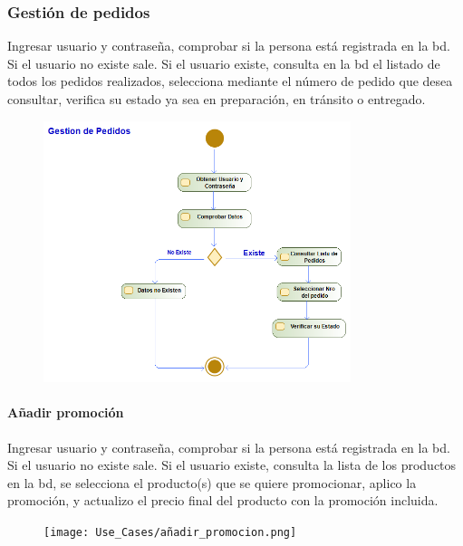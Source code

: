 \subsubsection{Gestión de pedidos}
Ingresar usuario y contraseña, comprobar si la persona está registrada en la \gls{bd}. Si el usuario no existe sale. Si el usuario existe, consulta en la \gls{bd} el listado de todos los pedidos realizados, selecciona mediante el número de pedido que desea consultar, verifica su estado ya sea en preparación, en tránsito o entregado.
\begin{figure}[H]
    \centering
    \includegraphics[width=0.8\textwidth]{Use_Cases/gestion_de_pedidos.png}
\end{figure}
\newpage
\paragraph{Añadir promoción}
Ingresar usuario y contraseña, comprobar si la persona está registrada en la \gls{bd}. Si el usuario no existe sale. Si el usuario existe, consulta la lista de los productos en la \gls{bd}, se selecciona el producto(s) que se quiere promocionar, aplico la promoción, y actualizo el precio final del producto con la promoción incluida.
\begin{figure}[H]
    \centering
    \texttt{[image: Use\_Cases/añadir\_promocion.png]}
\end{figure}
\newpage
